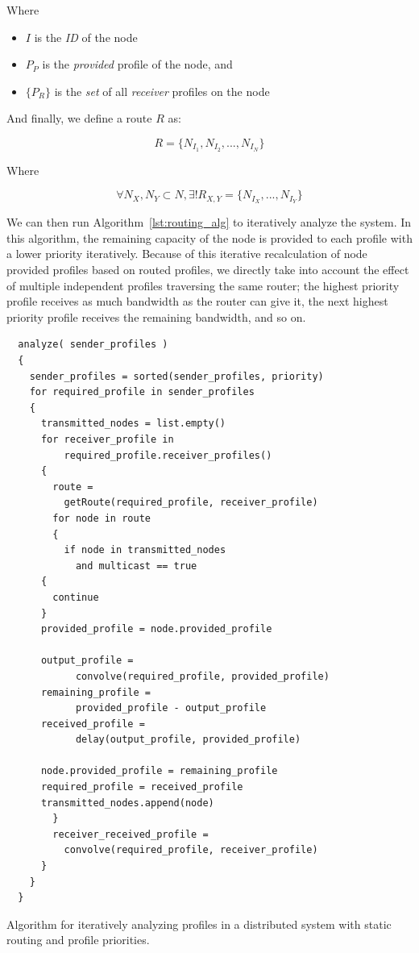 Where 

\begin{itemize}
\item $I$ is the \emph{ID} of the node
\item $P_P$ is the \emph{provided} profile of the node, and
\item $\{P_R\}$ is the \emph{set} of all \emph{receiver} profiles on the node
\end{itemize}

And finally, we define a route $R$ as:

\begin{equation}
  R = \{N_{I_1},N_{I_2},...,N_{I_N}\}
\end{equation}

Where

\begin{equation}
  \forall N_X,N_Y \subset N, \exists! R_{X,Y} = \{N_{I_X},...,N_{I_Y}\}
\end{equation}

We can then run Algorithm~\ref{lst:routing_alg} to iteratively analyze
the system.  In this algorithm, the remaining capacity of the node is
provided to each profile with a lower priority iteratively.  Because
of this iterative recalculation of node provided profiles based on
routed profiles, we directly take into account the effect of multiple
independent profiles traversing the same router; the highest priority
profile receives as much bandwidth as the router can give it, the next
highest priority profile receives the remaining bandwidth, and so on.

\begin{listing}[ht!]
  \begin{verbatim}
  analyze( sender_profiles )
  {
    sender_profiles = sorted(sender_profiles, priority)
    for required_profile in sender_profiles
    {
      transmitted_nodes = list.empty() 
      for receiver_profile in
          required_profile.receiver_profiles()
      {
        route =
          getRoute(required_profile, receiver_profile)
        for node in route
        {
          if node in transmitted_nodes
            and multicast == true
	  {
	    continue
	  }
	  provided_profile = node.provided_profile
            
	  output_profile =
            convolve(required_profile, provided_profile)
	  remaining_profile =
            provided_profile - output_profile
	  received_profile =
            delay(output_profile, provided_profile)
            
	  node.provided_profile = remaining_profile
	  required_profile = received_profile
	  transmitted_nodes.append(node)
        }
        receiver_received_profile =
          convolve(required_profile, receiver_profile)
      }
    }
  }
  \end{verbatim}
  \caption{Algorithm for iteratively analyzing profiles in a
    distributed system with static routing and profile priorities.}
  \label{lst:routing_alg}
\end{listing}

